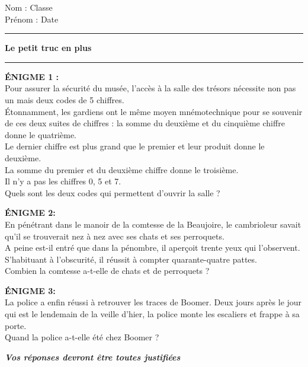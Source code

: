 \documentclass[a4paper,11pt]{article}
\newcommand{\titre}[5] 
{
\noindent #2 \hfill #4 \\
#3 \hfill #5

\vspace{-1.6cm}

\begin{center}\rule{6cm}{0.5mm}\end{center}
\vspace{0.2cm}
\begin{center}{\large{\textbf{#1}}}\end{center}
\begin{center}\rule{6cm}{0.5mm}\end{center}
}
\begin{document}
\pagestyle{empty}
\titre{Le petit truc en plus}{Nom :}{Prénom :}{Classe}{Date}


\vspace*{1cm}

\textbf{ÉNIGME 1 :}\\

Pour assurer la sécurité du musée, l'accès à la salle des trésors nécessite non pas un mais deux codes de 5 chiffres.\\
Étonnamment, les gardiens ont le même moyen mnémotechnique pour se souvenir de ces deux suites de chiffres : la somme du deuxième et du cinquième chiffre donne le quatrième.\\
Le dernier chiffre est plus grand que le premier et leur produit donne le deuxième.\\
La somme du premier et du deuxième chiffre donne le troisième.\\
Il n'y a pas les chiffres 0, 5 et 7.\\

Quels sont les deux codes qui permettent d'ouvrir la salle ?\\




\vspace*{1cm}

\textbf{ÉNIGME 2:}\\

En pénétrant dans le manoir de la comtesse de la Beaujoire, le cambrioleur savait qu'il se trouverait nez à nez avec ses chats et ses perroquets.\\
A peine est-il entré que dans la pénombre, il aperçoit trente yeux qui l'observent.\\
S'habituant à l'obscurité, il réussit à compter quarante-quatre pattes.\\

Combien la comtesse a-t-elle de chats et de perroquets ?\\


\vspace*{1cm}

\textbf{ÉNIGME 3:}\\

La police a enfin réussi à retrouver les traces de Boomer. Deux jours après le jour qui est le lendemain de la veille d'hier, la police monte les escaliers et frappe à sa porte.\\

Quand la police a-t-elle été chez Boomer ?\\

\vspace*{1cm}


\textit{\textbf{Vos réponses devront être toutes justifiées}}\\

\begin{flushright}
\end{flushright}
\end{document}
